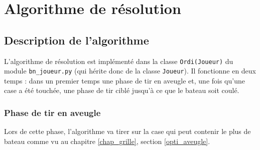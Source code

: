 \chapter{Algorithme de résolution}

\section{Description de l'algorithme}
L'algorithme de résolution est implémenté dans la classe \texttt{Ordi(Joueur)} du module \texttt{bn\_joueur.py} (qui hérite donc de la classe \texttt{Joueur}). Il fonctionne en deux temps : dans un premier temps une phase de tir en aveugle et, une fois qu'une case a été touchée, une phase de tir ciblé jusqu'à ce que le bateau soit coulé.

\subsection{Phase de tir en aveugle}
Lors de cette phase, l'algorithme va tirer sur la case qui peut contenir le plus de bateau comme vu au chapitre \ref{chap_grille}, section \ref{opti_aveugle}.

